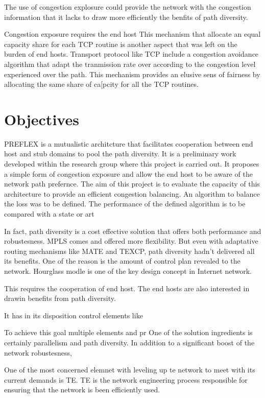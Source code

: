 The use of congestion explosure could provide the network with the congestion information that it lacks to draw more efficiently the benfits of path diversity. 

Congestion exposure requires the end host 
This mechanism that allocate an equal capacity share for each TCP routine
is another aspect that was left on the burden of end hosts. Transport protocol like TCP include a congestion avoidance algorithm that adapt the tranmission rate over according to the congestion level experienced over the path. This mechanism provides an elusive sens of fairness by allocating the same share of ca[pcity for all the TCP routines. 

\section{Objectives}

PREFLEX is a mutualistic architcture  that facilitates cooperation between end host and stub domains to pool the path diversity. It is a preliminary work developed within the research group where this project is carried out.
It proposes a simple form of congestion exposure and allow the end host to be aware of the network path prefernce. The aim of this project is to evaluate the capacity of this architecture to provide an efficient congestion balancing. An algorithm to balance the loss was to be defined.
The performance of the defined algorithm is to be compared with a state or art 
 
In fact, path diversity is a cost effective solution that offers both performance and robustesness. 
MPLS comes and offered more flexibility. But even with adaptative routing mechanisms like MATE and TEXCP, path diversity hadn't delivered all its benefits. One of the reason is the amount of control plan revealed to the network. Hourglass modle is one of the key design concept in Internet network. 

This requires the cooperation of end host. The end hosts are also interested in drawin benefits from path diversity.
 
It has in its disposition control elements like 

To achieve this goal multiple elements and pr
One of the solution ingredients is certainly parallelism and path diversity. In addition to a significant boost of the network robustesness, 

One of the most concerned elemnet with leveling up te network to meet with its current demands is TE. TE is the network engineering process responsible for ensuring that the network is been efficiently used. 


